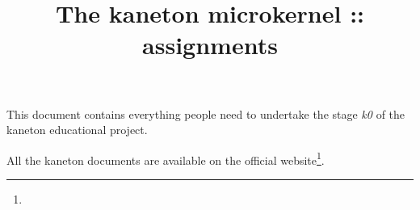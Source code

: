 %
%
%
%
%
%

%
%

%
%

\def\path{../../..}

%
%



%
%


%
%

\title{The kaneton microkernel :: assignments \\
       \version
       \logo}

%
%



%
%

\maketitle

%
%

This document contains everything people need to undertake the stage \emph{k0}
of the kaneton educational project.

\-

All the kaneton documents are available on
  the official website\footnote{}.

%
%

\tableofcontents

%
%


%
%





